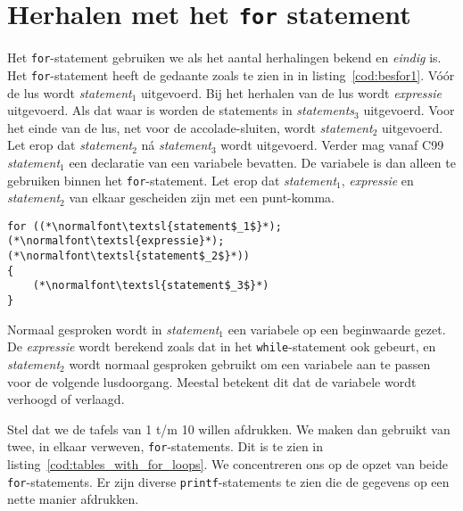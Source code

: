 %
%
%

\section{Herhalen met het \texttt{for} statement}
Het \texttt{for}-statement gebruiken we als het aantal herhalingen bekend en \textsl{eindig} is. Het \texttt{for}-statement heeft de gedaante zoals te zien in in listing~\ref{cod:besfor1}.
Vóór de lus wordt \textsl{statement}$_1$ uitgevoerd. Bij het herhalen van de lus wordt \textsl{expressie} uitgevoerd. Als dat waar is worden de statements in \textsl{statements$_3$} uitgevoerd. Voor het einde van de lus, net voor de accolade-sluiten, wordt \textsl{statement$_2$} uitgevoerd. Let erop dat  \textsl{statement$_2$} ná \textsl{statement$_3$} wordt uitgevoerd. Verder mag vanaf C99 \textsl{statement$_1$} een declaratie van een variabele bevatten. De variabele is dan alleen te gebruiken binnen het \texttt{for}-statement. Let erop dat  \textsl{statement$_1$}, \textsl{expressie} en \textsl{statement$_2$} van elkaar gescheiden zijn met een punt-komma.

\begin{lstlisting}[caption=Opzet van het \texttt{for}-statement.,label=cod:besfor1]
for ((*\normalfont\textsl{statement$_1$}*); (*\normalfont\textsl{expressie}*); (*\normalfont\textsl{statement$_2$}*))
{
    (*\normalfont\textsl{statement$_3$}*)
}
\end{lstlisting}

Normaal gesproken wordt in \textsl{statement$_1$} een variabele op een beginwaarde gezet. De \textsl{expressie} wordt berekend zoals dat in het \texttt{while}-statement ook gebeurt, en \textsl{statement$_2$} wordt normaal gesproken gebruikt om een variabele aan te passen voor de volgende lusdoorgang. Meestal betekent dit dat de variabele wordt verhoogd of verlaagd.

Stel dat we de tafels van 1 t/m 10 willen afdrukken. We maken dan gebruikt van twee, in elkaar verweven, \texttt{for}-statements. Dit is te zien in listing~\ref{cod:tables_with_for_loops}. We concentreren ons op de opzet van beide \texttt{for}-statements. Er zijn diverse \texttt{printf}-statements te zien die de gegevens op een nette manier afdrukken.

